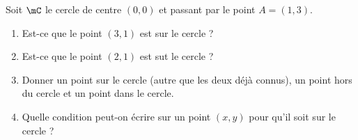 
\begin{exercice}\label{exoSeconde-0079}

Soit \( \mC\) le cercle de centre \( (0,0)\) et passant par le point \( A=(1,3)\).
\begin{multicols}{2}
    \begin{enumerate}
        \item
            Est-ce que le point \( (3,1)\) est sur le cercle ?
        \item
            Est-ce que le point \( (2,1)\) est sut le cercle ?
        \item
            Donner un point sur le cercle (autre que les deux déjà connus), un point hors du cercle et un point dans le cercle.
        \item
            Quelle condition peut-on écrire sur un point \( (x,y)\) pour qu'il soit sur le cercle ?
    \end{enumerate}
\end{multicols}

\end{exercice}
